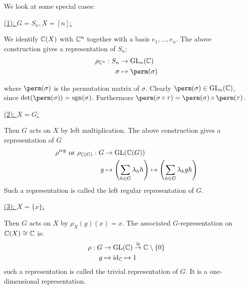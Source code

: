 \documentclass[twoside = false,	%
		headsepline,		%
		parskip = true,
		]{scrbook}						%
\begin{document}
        We look at some special cases:
        
        \underline{(1): $G = S_n, X = [n]$:}
        
            We identify $\mathbb C(X)$ with $\mathbb C^n$ together with a basis $e_1,\dots,e_n$. The above construction gives a representation of $S_n$:
            \begin{equation*}
            \begin{split}
                \rho_{\C^n}: S_n &\to \GL_n(\C) \\
                            \sigma &\mapsto \perm(\sigma)
            \end{split}
            \end{equation*}
            
            where $\perm(\sigma)$ is the permutation matrix of $\sigma$. Clearly $\perm(\sigma) \in \GL_n(\C)$, since $\det(\perm(\sigma)) = \sgn(\sigma)$. Furthermore $\perm(\sigma \circ \tau) = \perm(\sigma) \circ \perm(\tau)$.
            
        \underline{(2): $X=G$:}
        
            Then $G$ acts on $X$ by left multiplication. The above construction gives a representation of $G$
            \begin{equation*}
            \begin{split}
                \rho^{\text{reg}} \text{ or } \rho_{\mathbb C(G)}: G &\to \mathrm{GL}(\mathbb C(G)) \\
                g &\mapsto \left( \sum_{h \in G} \lambda_h h \right) \mapsto \left( \sum_{h \in G} \lambda_h gh \right)
            \end{split}
            \end{equation*}
            Such a representation is called the left regular representation of $G$.
            
        \underline{(3): $X = \{x\}$:}
        
        Then $G$ acts on $X$ by $\rho_X(g)(x) = x$. The associated $G$-representation on $\mathbb C(X) \cong \mathbb C$ is:
        \begin{equation*}
        \begin{split}
            \rho: G &\to \mathrm{GL}(\mathbb C) \overset{\cong}{\to} \mathbb C\setminus\{0\} \\
            g &\mapsto \mathrm{id}_\mathbb C \mapsto 1
        \end{split}
        \end{equation*}
        such a representation is called the trivial representation of $G$. It is a one-dimensional representation.
        
\end{document}
